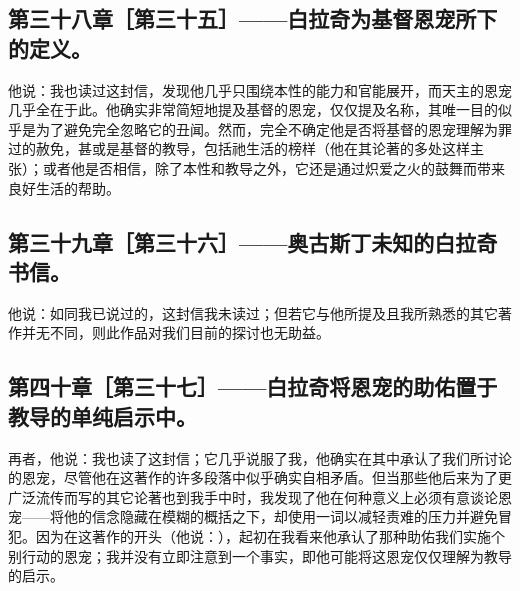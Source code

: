 
\subsection{第三十八章［第三十五］——白拉奇为基督恩宠所下的定义。}

他说：我也读过这封信，发现他几乎只围绕本性的能力和官能展开，而天主的恩宠几乎全在于此。他确实非常简短地提及基督的恩宠，仅仅提及名称，其唯一目的似乎是为了避免完全忽略它的丑闻。然而，完全不确定他是否将基督的恩宠理解为罪过的赦免，甚或是基督的教导，包括祂生活的榜样（他在其论著的多处这样主张）；或者他是否相信，除了本性和教导之外，它还是通过炽爱之火的鼓舞而带来良好生活的帮助。\par


\subsection{第三十九章［第三十六］——奥古斯丁未知的白拉奇书信。}

他说：如同我已说过的，这封信我未读过；但若它与他所提及且我所熟悉的其它著作并无不同，则此作品对我们目前的探讨也无助益。\par


\subsection{第四十章［第三十七］——白拉奇将恩宠的助佑置于教导的单纯启示中。}

再者，他说：我也读了这封信；它几乎说服了我，他确实在其中承认了我们所讨论的恩宠，尽管他在这著作的许多段落中似乎确实自相矛盾。但当那些他后来为了更广泛流传而写的其它论著也到我手中时，我发现了他在何种意义上必须有意谈论恩宠——将他的信念隐藏在模糊的概括之下，却使用一词以减轻责难的压力并避免冒犯。因为在这著作的开头（他说：），起初在我看来他承认了那种助佑我们实施个别行动的恩宠；我并没有立即注意到一个事实，即他可能将这恩宠仅仅理解为教导的启示。\par

